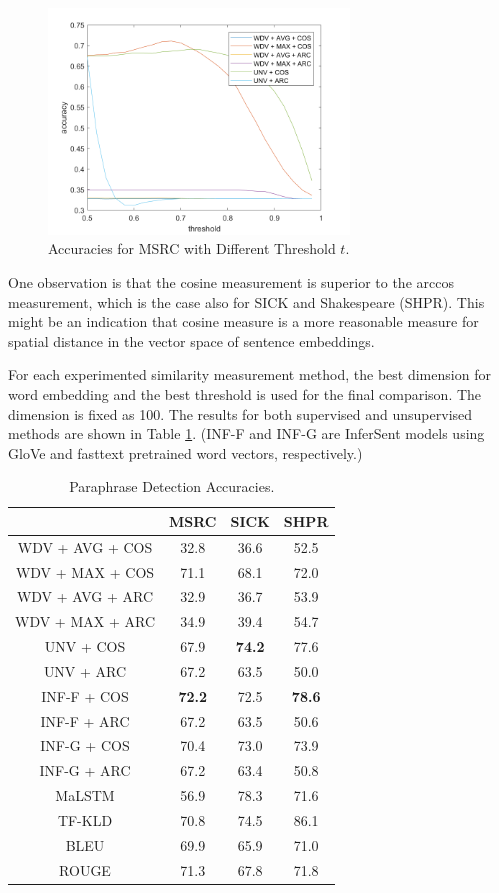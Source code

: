 \documentclass[runningheads]{llncs}
\begin{document}
\begin{spacing}{1.1}
\begin{figure}[htbp]
	\centering
	\includegraphics[width=8cm]{./5.png}
	\caption{Accuracies for MSRC with Different Threshold $t$.}\label{fig:5}
\end{figure}

One observation is that the cosine measurement is superior to the arccos measurement, which is the case also for SICK and Shakespeare (SHPR). This might be an indication that cosine measure is a more reasonable measure for spatial distance in the vector space of sentence embeddings.

For each experimented similarity measurement method, the best dimension for word embedding and the best threshold is used for the final comparison. The dimension is fixed as 100. The results for both supervised and unsupervised methods are shown in Table \ref{tb:2}. (INF-F and INF-G are InferSent models using GloVe and fasttext pretrained word vectors, respectively.)

\begin{table}[h!]\footnotesize
	\centering
	\small
	\begin{tabular}{|c|c|c|c|}
		\hline
		\diagbox{Method}{Accuracy (\%)}{Corpus} & MSRC & SICK & SHPR \\
		\hline
		\hline
		WDV + AVG + COS & 32.8 & 36.6 & 52.5 \\
		WDV + MAX + COS & 71.1 & 68.1 & 72.0 \\
		WDV + AVG + ARC & 32.9 & 36.7 & 53.9 \\
		WDV + MAX + ARC & 34.9 & 39.4 & 54.7 \\
		UNV + COS & 67.9 & \textbf{74.2} & 77.6 \\
		UNV + ARC & 67.2 & 63.5 & 50.0 \\
		INF-F + COS & \textbf{72.2} & 72.5 & \textbf{78.6} \\
		INF-F + ARC & 67.2 & 63.5 & 50.6 \\
		INF-G + COS & 70.4 & 73.0 & 73.9 \\
		INF-G + ARC & 67.2 & 63.4 & 50.8 \\
		\hline
		MaLSTM & 56.9 & 78.3 & 71.6 \\
		TF-KLD & 70.8 & 74.5 & 86.1 \\
		\hline
		BLEU & 69.9 & 65.9 & 71.0 \\
		ROUGE & 71.3 & 67.8 & 71.8 \\
		\hline
	\end{tabular}
	\caption{Paraphrase Detection Accuracies.}\label{tb:2}
\end{table}


\end{spacing}
\end{document}
